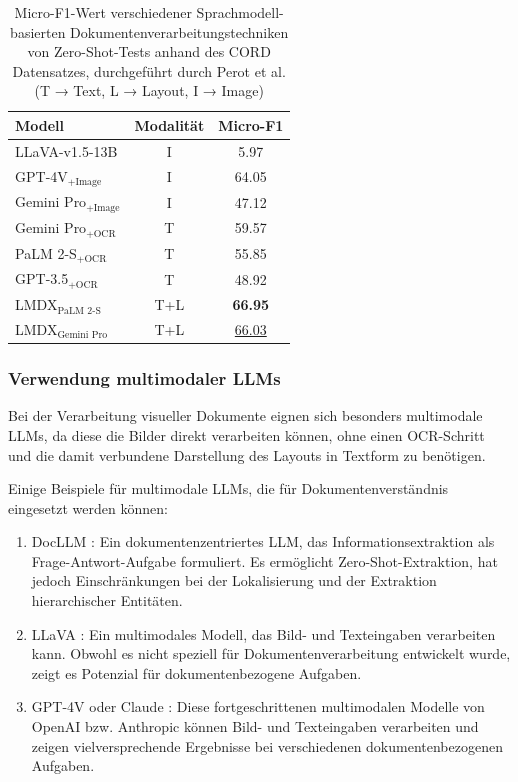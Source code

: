 \begin{table}
\centering
\begin{tabular}{lcc}
\hline
Modell & Modalität & Micro-F1 \\
\hline
LLaVA-v1.5-13B & I & 5.97 \\
GPT-4V$_\text{+Image}$ & I & 64.05 \\
Gemini Pro$_\text{+Image}$ & I & 47.12 \\
Gemini Pro$_\text{+OCR}$ & T & 59.57 \\
PaLM 2-S$_\text{+OCR}$ & T & 55.85 \\
GPT-3.5$_\text{+OCR}$ & T & 48.92 \\
LMDX$_\text{PaLM 2-S}$ & T+L & \textbf{66.95} \\
LMDX$_\text{Gemini Pro}$ & T+L & \underline{66.03} \\
\hline
\end{tabular}
\caption{Micro-F1-Wert verschiedener Sprachmodell-basierten Dokumentenverarbeitungstechniken von Zero-Shot-Tests anhand des CORD \cite{park2019cord} Datensatzes, durchgeführt durch Perot et al.\cite{PerotVincent2024LLMD} (T → Text, L → Layout, I → Image) }
\label{tab:lmdx_cord_zero_shot_results}
\end{table}

\subsubsection{Verwendung multimodaler \glspl{LLM}}
\label{subsec:verwendung-multimodaler-llms}

Bei der Verarbeitung visueller Dokumente eignen sich besonders multimodale \glspl{LLM}, da diese die Bilder direkt verarbeiten können, ohne einen \gls{OCR}-Schritt und die damit verbundene Darstellung des Layouts in Textform zu benötigen.

Einige Beispiele für multimodale \glspl{LLM}, die für Dokumentenverständnis eingesetzt werden können:

\begin{enumerate}
    \item DocLLM \cite{WangDongsheng2023DAlg}: Ein dokumentenzentriertes \gls{LLM}, das Informationsextraktion als Frage-Antwort-Aufgabe formuliert. Es ermöglicht Zero-Shot-Extraktion, hat jedoch Einschränkungen bei der Lokalisierung und der Extraktion hierarchischer Entitäten.
    \item LLaVA \cite{CaffagniDavide2024WHRG}: Ein multimodales Modell, das Bild- und Texteingaben verarbeiten kann. Obwohl es nicht speziell für Dokumentenverarbeitung entwickelt wurde, zeigt es Potenzial für dokumentenbezogene Aufgaben.
    \item GPT-4V \cite{openai_chatgpt} oder Claude \cite{anthropic_claude}: Diese fortgeschrittenen multimodalen Modelle von OpenAI bzw. Anthropic können Bild- und Texteingaben verarbeiten und zeigen vielversprechende Ergebnisse bei verschiedenen dokumentenbezogenen Aufgaben.
\end{enumerate}

